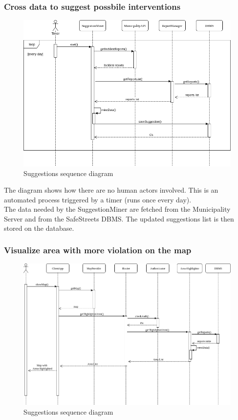 \documentclass{article}
\begin{document}
\newpage
\subsubsection{Cross data to suggest possbile interventions}
\begin{figure}[ht]
\centering
	\includegraphics[width=1.0\textwidth]{images/miner-sequence-diagram.png}
	\caption{Suggestions sequence diagram}
	\label{fig:miner-sequence-diagram}
\end{figure}

The diagram shows how there are no human actors involved. This is an automated process triggered by a timer (runs once every day). \\
The data needed by the SuggestionMiner are fetched from the Municipality Server and from the SafeStreets DBMS. The updated suggestions list is then stored on the database.
\newpage
\subsubsection{Visualize area with more violation on the map}
\begin{figure}[ht]
\centering
	\includegraphics[width=1.0\textwidth]{images/area-highlight-sequence.png}
	\caption{Suggestions sequence diagram}
	\label{fig:area-highlight-sequence}
\end{figure}
\end{document}

